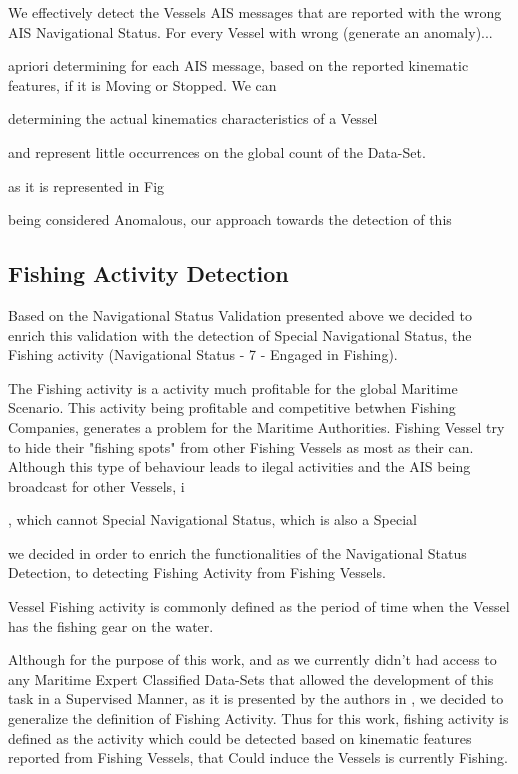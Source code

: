 We effectively detect the Vessels AIS messages that are reported with the wrong AIS Navigational Status. For every Vessel with wrong (generate an anomaly)...


apriori determining for each AIS message, based on the reported kinematic features, if it is Moving or Stopped. We can 

determining the actual kinematics characteristics of a Vessel

and represent little occurrences on the global count of the Data-Set.

as it is represented in Fig

being considered Anomalous, our approach towards the detection of this  
\fi

\subsection{Fishing Activity Detection}
\label{subsection: Fishing Activity Detection}

Based on the Navigational Status Validation presented above we decided to enrich this validation with the detection of Special Navigational Status, the Fishing activity (Navigational Status - 7 - Engaged in Fishing). 

The Fishing activity is a activity much profitable for the global Maritime Scenario. This activity being profitable and competitive betwhen Fishing Companies, generates a problem for the Maritime Authorities. Fishing Vessel try to hide their "fishing spots" from other Fishing Vessels as most as their can. Although this type of behaviour leads to ilegal activities   and the AIS being broadcast for other Vessels, i


, which cannot Special Navigational Status, which is also a Special 

we decided in order to enrich the functionalities of the Navigational Status Detection, to detecting Fishing Activity from Fishing Vessels. 

Vessel Fishing activity is commonly defined as the period of time when the Vessel has the fishing gear on the water. 

Although for the purpose of this work, and as we currently didn't had access to any Maritime Expert Classified Data-Sets that allowed the development of this task in a Supervised Manner, as it is presented by the authors in \cite{DeSouza2016ImprovingLearning}, we decided to generalize the definition of Fishing Activity.
Thus for this work, fishing activity is defined as the activity which could be detected based on kinematic features reported from Fishing Vessels, that Could induce the Vessels is currently Fishing. 

